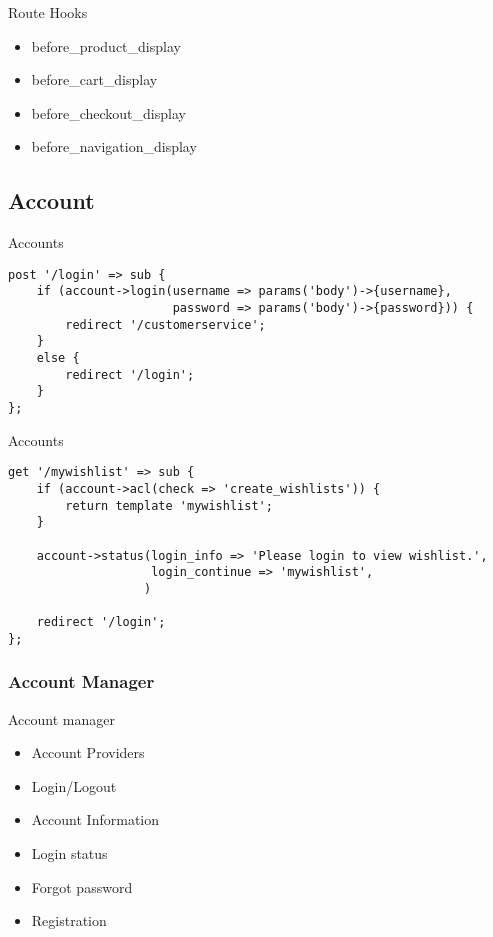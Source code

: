 \begin{frame}{Route Hooks}
\begin{itemize}
\item before\_product\_display
\item before\_cart\_display
\item before\_checkout\_display
\item before\_navigation\_display
\end{itemize}
\end{frame}

\subsection{Account}
\begin{frame}[fragile]{Accounts}
\begin{lstlisting}
post '/login' => sub {
    if (account->login(username => params('body')->{username},
                       password => params('body')->{password})) {
        redirect '/customerservice';
    }
    else {
        redirect '/login';
    }
};
\end{lstlisting}
\end{frame}

\begin{frame}[fragile]{Accounts}
\begin{lstlisting}
get '/mywishlist' => sub {
    if (account->acl(check => 'create_wishlists')) {
        return template 'mywishlist';
    }

    account->status(login_info => 'Please login to view wishlist.',
                    login_continue => 'mywishlist',
                   )

    redirect '/login';
};
\end{lstlisting}
\end{frame}

\subsubsection{Account Manager}
\begin{frame}{Account manager}
\begin{itemize}
\item Account Providers
\item Login/Logout
\item Account Information
\item Login status
\item Forgot password
\item Registration
\end{itemize}
\end{frame}

